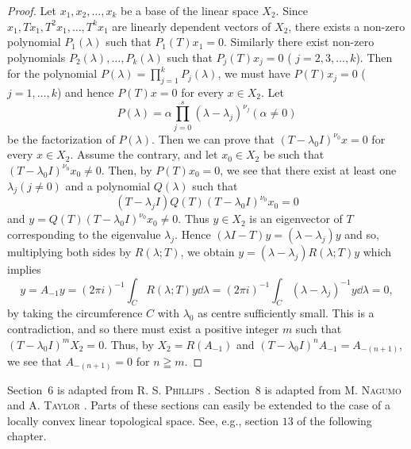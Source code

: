\begin{proof}
 Let $x_1, x_2, \ldots, x_k$ be a base of the linear space $X_2$. Since $x_1, Tx_1, T^2x_1, \ldots, T^k x_1$ are linearly dependent vectors of $X_2$, there exists a non-zero polynomial $P_1(\lambda)$ such that $P_1(T)x_1 = 0$. Similarly there exist non-zero polynomials $P_2(\lambda), \ldots, P_k(\lambda)$ such that $P_j(T)x_j = 0$ ( $j = 2, 3, \ldots, k$). Then for the polynomial $P(\lambda) = \prod\limits_{j=1}^{k} P_j(\lambda)$, we must have $P(T)x_j = 0$ ( $j = 1, \ldots, k$) and hence $P(T)x = 0$ for every $x \in X_2$. Let 
\[
P (\lambda) = \alpha \prod\limits_{j=0} ^{s} (\lambda - \lambda_{j}) ^ {\nu_{j}} (\alpha \neq 0)
\]
be the factorization of $P(\lambda)$. Then we can prove that $(T - \lambda_0 I)^{\nu_0} x = 0$ for every $x \in X_2$. Assume the contrary, and let $x_0 \in X_2$ be such that $(T - \lambda_0 I)^{\nu_0} x_0 \neq 0$. Then, by $P(T)x_0 = 0$, we see that there exist at least one $\lambda_j (j \neq 0)$ and a polynomial $Q(\lambda)$ such that 
\[
(T - \lambda_{j} I) Q (T) (T - \lambda_{0} I) ^ {\nu_{0}} x _{0} = 0
\]
and $y = Q(T)(T - \lambda_0 I)^{\nu_0} x_0 \neq 0$. Thus $y \in X_2$ is an eigenvector of $T$ corresponding to the eigenvalue $\lambda_j$. Hence $(\lambda I - T)y = (\lambda - \lambda_j)y$ and so, multiplying both sides by $R(\lambda; T)$, we obtain $y = (\lambda - \lambda_j)R(\lambda; T)y$ which implies 
\[
y = A _{-1} y = (2 \pi i) ^{-1} \int_{C} R (\lambda ; T) y \dd \lambda = (2 \pi i) ^{-1} \int_{C} (\lambda - \lambda_{j}) ^{-1} y \dd \lambda = 0,
\]
by taking the circumference $C$ with $\lambda_{0}$ as centre sufficiently small. This is a contradiction, and so there must exist a positive integer $m$ such that $(T-\lambda_{0}I)^{m}X_{2}=0$. Thus, by $X_{2}=R(A_{-1})$ and $(T-\lambda_{0}I)^{n}A_{-1}=A_{-(n+1)}$, we see that $A_{-(n+1)}=0$ for $n\geqq m$. 
\end{proof}


Section~\hyperref[sec:VIII.6]{$6$} is adapted from R. S. \textsc{Phillips} \cite{phillips252}. Section~\hyperref[sec:VIII.8]{$8$} is adapted from M. \textsc{Nagumo} \cite{nagumo215} and A. \textsc{Taylor} \cite{taylor321}. Parts of these sections can easily be extended to the case of a locally convex linear topological space. See, e.g., section $13$ of the following chapter. 
